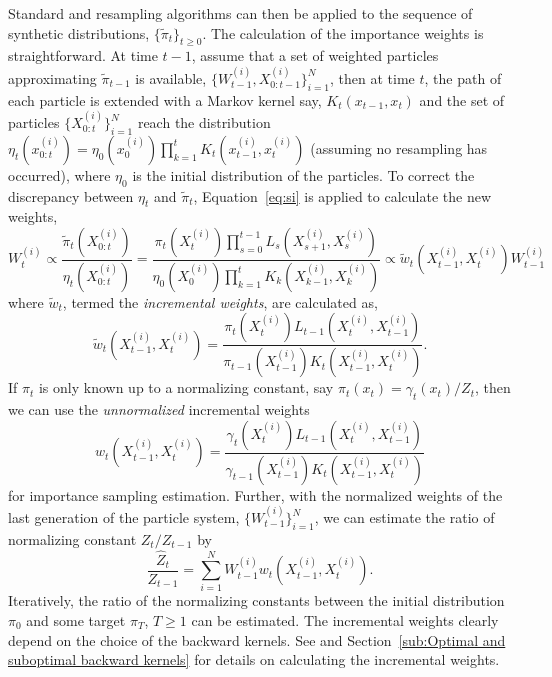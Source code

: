 Standard \sis and resampling algorithms can then be applied to the sequence of synthetic distributions, $\{\tilde\pi_t\}_{t\ge0}$. The calculation of the importance weights is straightforward. At time $t-1$, assume that a set of weighted particles approximating $\tilde\pi_{t-1}$ is available, $\{W_{t-1}^{(i)},X_{0:t-1}^{(i)}\}_{i=1}^N$, then at time $t$, the path of each particle is extended with a Markov kernel say, $K_t(x_{t-1}, x_t)$ and the set of particles $\{X_{0:t}^{(i)}\}_{i=1}^N$ reach the distribution $\eta_t(x_{0:t}^{(i)}) = \eta_0(x_0^{(i)})\prod_{k=1}^tK_t(x_{t-1}^{(i)}, x_t^{(i)})$ (assuming no resampling has occurred), where $\eta_0$ is the initial distribution of the particles. To correct the discrepancy between $\eta_t$ and $\tilde\pi_t$, Equation~\eqref{eq:si} is applied to calculate the new weights,
\begin{equation}
  W_t^{(i)} \propto \frac{\tilde\pi_t(X_{0:t}^{(i)})}{\eta_t(X_{0:t}^{(i)})}
  = \frac{\pi_t(X_t^{(i)})\prod_{s=0}^{t-1}L_s(X_{s+1}^{(i)}, X_s^{(i)})}
  {\eta_0(X_0^{(i)})\prod_{k=1}^tK_k(X_{k-1}^{(i)},X_k^{(i)})}
  \propto \tilde{w}_t(X_{t-1}^{(i)}, X_t^{(i)})W_{t-1}^{(i)}
\end{equation}
where $\tilde{w}_t$, termed the \emph{incremental weights}, are calculated as,
\begin{equation}
  \tilde{w}_t(X_{t-1}^{(i)},X_t^{(i)}) =
  \frac{\pi_t(X_t^{(i)})L_{t-1}(X_t^{(i)}, X_{t-1}^{(i)})}
  {\pi_{t-1}(X_{t-1}^{(i)})K_t(X_{t-1}^{(i)}, X_t^{(i)})}.
\end{equation}
If $\pi_t$ is only known up to a normalizing constant, say $\pi_t(x_t) = \gamma_t(x_t)/Z_t$, then we can use the \emph{unnormalized} incremental weights
\begin{equation}
  w_t(X_{t-1}^{(i)},X_t^{(i)}) =
  \frac{\gamma_t(X_t^{(i)})L_{t-1}(X_t^{(i)}, X_{t-1}^{(i)})}
  {\gamma_{t-1}(X_{t-1}^{(i)})K_t(X_{t-1}^{(i)}, X_t^{(i)})}
\end{equation}
for importance sampling estimation. Further, with the normalized weights of the last generation of the particle system, $\{W_{t-1}^{(i)}\}_{i=1}^N$, we can estimate the ratio of normalizing constant $Z_t/Z_{t-1}$ by
\begin{equation}
  \frac{\hat{Z}_t}{Z_{t-1}} =
  \sum_{i=1}^N W_{t-1}^{(i)}w_t(X_{t-1}^{(i)},X_t^{(i)}).
  \label{eq:ratio normalized}
\end{equation}
Iteratively, the ratio of the normalizing constants between the initial distribution $\pi_0$ and some target $\pi_T$, $T\ge1$ can be estimated. The incremental weights clearly depend on the choice of the backward kernels. See \cite{DelMoral:2006hc} and Section~\ref{sub:Optimal and suboptimal backward kernels} for details on calculating the incremental weights.

